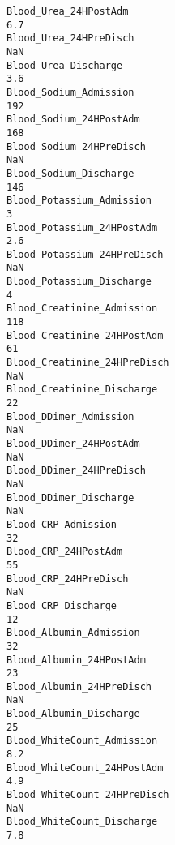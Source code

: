 \documentclass[hf]{ceurart}
\begin{document}
\begin{verbatim}
Blood_Urea_24HPostAdm                                                             6.7
Blood_Urea_24HPreDisch                                                            NaN
Blood_Urea_Discharge                                                              3.6
Blood_Sodium_Admission                                                            192
Blood_Sodium_24HPostAdm                                                           168
Blood_Sodium_24HPreDisch                                                          NaN
Blood_Sodium_Discharge                                                            146
Blood_Potassium_Admission                                                           3
Blood_Potassium_24HPostAdm                                                        2.6
Blood_Potassium_24HPreDisch                                                       NaN
Blood_Potassium_Discharge                                                           4
Blood_Creatinine_Admission                                                        118
Blood_Creatinine_24HPostAdm                                                        61
Blood_Creatinine_24HPreDisch                                                      NaN
Blood_Creatinine_Discharge                                                         22
Blood_DDimer_Admission                                                            NaN
Blood_DDimer_24HPostAdm                                                           NaN
Blood_DDimer_24HPreDisch                                                          NaN
Blood_DDimer_Discharge                                                            NaN
Blood_CRP_Admission                                                                32
Blood_CRP_24HPostAdm                                                               55
Blood_CRP_24HPreDisch                                                             NaN
Blood_CRP_Discharge                                                                12
Blood_Albumin_Admission                                                            32
Blood_Albumin_24HPostAdm                                                           23
Blood_Albumin_24HPreDisch                                                         NaN
Blood_Albumin_Discharge                                                            25
Blood_WhiteCount_Admission                                                        8.2
Blood_WhiteCount_24HPostAdm                                                       4.9
Blood_WhiteCount_24HPreDisch                                                      NaN
Blood_WhiteCount_Discharge                                                        7.8

\end{verbatim}
\end{document}
